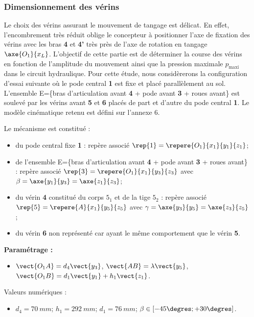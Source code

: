 \subsubsection{Dimensionnement des vérins}
Le choix des vérins assurant le mouvement de tangage est délicat. En effet, l’encombrement très réduit oblige le
concepteur à positionner l’axe de fixation des vérins avec les bras \textbf{4} et \textbf{4’} très près de l’axe de rotation en tangage $\axe{O_1}{x_L}$. L’objectif de cette partie est de déterminer la course des vérins en fonction de l’amplitude du mouvement ainsi que la pression maximale $p_{\text{maxi}}$ dans le circuit hydraulique. Pour cette étude, nous considèrerons la configuration d’essai suivante où le pode central \textbf{1} est fixe et placé parallèlement au sol. L’ensemble E=\{bras d’articulation avant \textbf{4} + pode avant \textbf{3} + roues avant\} est soulevé par les vérins avant \textbf{5} et \textbf{6} placés de part et d’autre du pode central \textbf{1}. Le modèle cinématique retenu est défini sur l’annexe 6.

Le mécanisme est constitué : 
\begin{itemize}
 \item du pode central fixe \textbf{1} : repère associé $\rep{1}=\repere{O_1}{x_1}{y_1}{z_1}$;
 \item de l'ensemble  E=\{bras d’articulation avant \textbf{4} + pode avant \textbf{3} + roues avant\} : repère associé $\rep{3}=\repere{O_1}{x_1}{y_3}{z_3}$ avec $\beta = \axe{y_1}{y_3} =\axe{z_1}{z_3}$;
 \item du vérin \textbf{4} constitué du corps \textbf{$5_1$} et de la tige \textbf{$5_2$} : repère associé $\rep{5}=\repere{A}{x_1}{y_5}{z_5}$ avec
  $\gamma = \axe{y_3}{y_5}= \axe{z_3}{z_5}$;
 \item du vérin \textbf{6} non représenté car ayant le même comportement que le vérin \textbf{5}.
\end{itemize}

\textbf{Paramétrage :}
\begin{itemize}
 \item $\vect{O_1 A}=d_4\vect{y_3}$, $\vect{AB}=\lambda\vect{y_5}$, $\vect{O_1 B}=d_1\vect{y_1}+h_1\vect{z_1}$.
\end{itemize}

Valeurs numériques : 
\begin{itemize}
 \item $d_4 =\SI{70}{mm}$; $h_1 =\SI{292}{mm}$; $d_1 =\SI{76}{mm}$; $\beta \in \left[ -45\degres;+30\degres\right]$.
\end{itemize}

